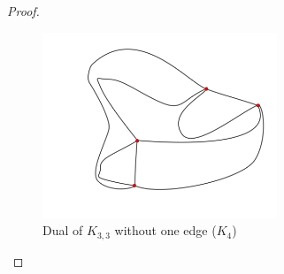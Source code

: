 \begin{proof}
    \begin{figure}[H]
        \begin{center}
        \includegraphics[width=7cm]{Test2/Problem9/PlanarK3_3WithoutOneEdge_dual.png}
        \end{center}                            
        \caption{Dual of $K_{3,3}$ without one edge ($K_4$)}
        \label{t2:p9_PlanarK3_3WithoutOneEdge_dual.png}                        
    \end{figure}\pn
\end{proof}